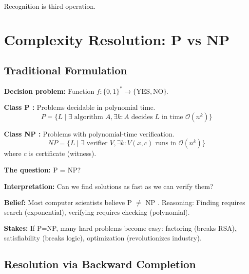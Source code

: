 \documentclass[twocolumn,10pt]{revtex4-2}
\theoremstyle{definition}
\theoremstyle{remark}
\newcommand{\bigO}{\mathcal{O}}
\begin{document}
Recognition is third operation.

\section{Complexity Resolution: P vs NP}
\label{sec:complexity_resolution}

\subsection{Traditional Formulation}

\textbf{Decision problem:} Function $f: \{0,1\}^* \to \{\text{YES}, \text{NO}\}$.

\vspace{0.2cm}
\noindent\textbf{Class P \cite{Cobham1965}:} Problems decidable in polynomial time.
\begin{equation}
P = \{L \mid \exists \text{ algorithm } A, \exists k: A \text{ decides } L \text{ in time } \bigO(n^k)\}
\end{equation}

\textbf{Class NP \cite{Cook1971}:} Problems with polynomial-time verification.
\begin{equation}
NP = \{L \mid \exists \text{ verifier } V, \exists k: V(x, c) \text{ runs in } \bigO(n^k)\}
\end{equation}
where $c$ is certificate (witness).

\vspace{0.2cm}
\noindent\textbf{The question:} P = NP?

\textbf{Interpretation:} Can we find solutions as fast as we can verify them?

\vspace{0.2cm}
\noindent\textbf{Belief:} Most computer scientists believe P $\neq$ NP \cite{Gasarch2002}. Reasoning: Finding requires search (exponential), verifying requires checking (polynomial).

\vspace{0.2cm}
\noindent\textbf{Stakes:} If P=NP, many hard problems become easy: factoring (breaks RSA), satisfiability (breaks logic), optimization (revolutionizes industry).

\subsection{Resolution via Backward Completion}
\end{document}
